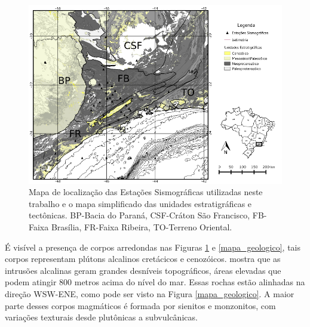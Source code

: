 \begin{figure}[!ht]
\centering
\includegraphics[scale=0.5]{Figs/mapa_estacoes_geologico.png}
\caption[Mapa de localização das Estações Sismográficas na região com o mapa geológico simplificado.]{Mapa de localização das Estações Sismográficas utilizadas neste trabalho e o mapa simplificado das unidades estratigráficas e tectônicas. BP-Bacia do Paraná, CSF-Cráton São Francisco, FB-Faixa Brasília, FR-Faixa Ribeira, TO-Terreno Oriental.}
\label{mapa_estacoes_geologico}
\end{figure}

É visível a presença de corpos arredondas nas Figuras \ref{mapa_estacoes_geologico} e \ref{mapa_geologico}, tais corpos representam plútons alcalinos cretácicos e cenozóicos. \cite{MOTA_2012} mostra que as intrusões alcalinas geram grandes desníveis topográficos, áreas elevadas que podem atingir 800 metros acima do nível do mar. Essas rochas estão alinhadas na direção WSW-ENE, como pode ser visto na Figura \ref{mapa_geologico}. A maior parte desses corpos magmáticos é formada por sienitos e monzonitos, com variações texturais desde plutônicas a subvulcânicas.

